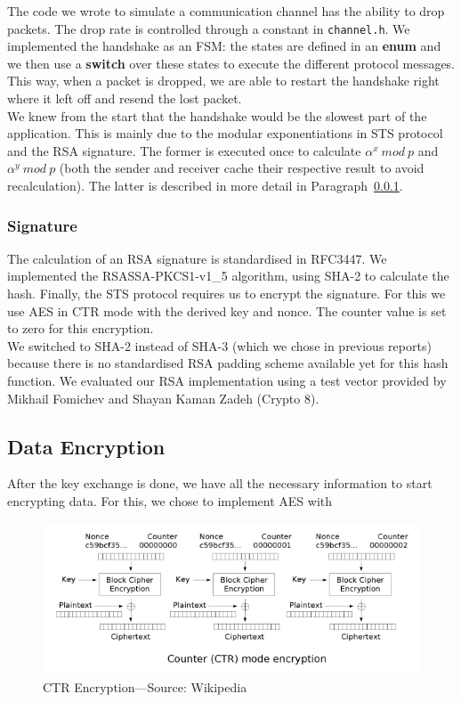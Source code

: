 \documentclass[a4paper]{article}
\begin{document}
The code we wrote to simulate a communication channel has the ability to drop packets. The drop rate is controlled through a constant in \texttt{channel.h}. We implemented the handshake as an FSM: the states are defined in an \textbf{enum} and we then use a \textbf{switch} over these states to execute the different protocol messages. This way, when a packet is dropped, we are able to restart the handshake right where it left off and resend the lost packet.\\

We knew from the start that the handshake would be the slowest part of the application. This is mainly due to the modular exponentiations in STS protocol and the RSA signature. The former is executed once to calculate $\alpha^x\ mod\ p$ and $\alpha^y\ mod\ p$ (both the sender and receiver cache their respective result to avoid recalculation). The latter is described in more detail in Paragraph~\ref{par:signature}.

\subsubsection{Signature}
\label{par:signature}

The calculation of an RSA signature is standardised in RFC3447. We implemented the RSASSA-PKCS1-v1\_5 algorithm, using SHA-2 to calculate the hash. Finally, the STS protocol requires us to encrypt the signature. For this we use AES in CTR mode with the derived key and nonce. The counter value is set to zero for this encryption.\\

We switched to SHA-2 instead of SHA-3 (which we chose in previous reports) because there is no standardised RSA padding scheme available yet for this hash function. We evaluated our RSA implementation using a test vector provided by Mikhail Fomichev and Shayan Kaman Zadeh (Crypto 8).

\subsection{Data Encryption}

After the key exchange is done, we have all the necessary information to start encrypting data. For this, we chose to implement AES with 

\begin{figure}[h]
    \centering
    \includegraphics[scale=0.75]{ctr_encryption.png}
    \caption{CTR Encryption---Source: Wikipedia}
    \label{fig:ctr_encryption}
\end{figure}
\end{document}
